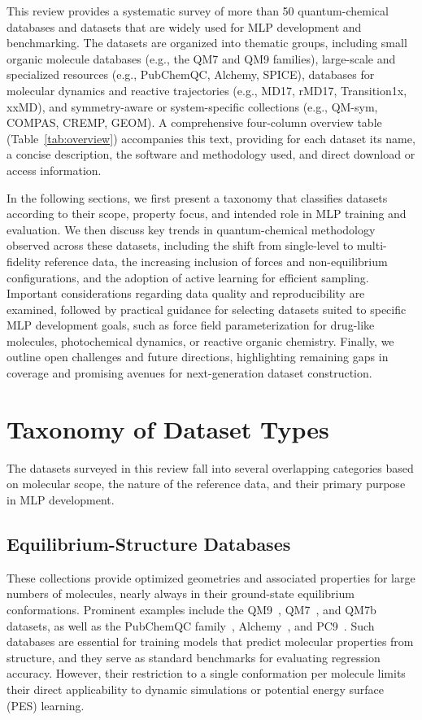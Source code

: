 \documentclass[12pt]{article}
\begin{document}
This review provides a systematic survey of more than 50 quantum-chemical databases and datasets that are widely used for MLP development and benchmarking. The datasets are organized into thematic groups, including small organic molecule databases (e.g., the QM7 and QM9 families), large-scale and specialized resources (e.g., PubChemQC, Alchemy, SPICE), databases for molecular dynamics and reactive trajectories (e.g., MD17, rMD17, Transition1x, xxMD), and symmetry-aware or system-specific collections (e.g., QM-sym, COMPAS, CREMP, GEOM). A comprehensive four-column overview table (Table~\ref{tab:overview}) accompanies this text, providing for each dataset its name, a concise description, the software and methodology used, and direct download or access information.

In the following sections, we first present a taxonomy that classifies datasets according to their scope, property focus, and intended role in MLP training and evaluation. We then discuss key trends in quantum-chemical methodology observed across these datasets, including the shift from single-level to multi-fidelity reference data, the increasing inclusion of forces and non-equilibrium configurations, and the adoption of active learning for efficient sampling. Important considerations regarding data quality and reproducibility are examined, followed by practical guidance for selecting datasets suited to specific MLP development goals, such as force field parameterization for drug-like molecules, photochemical dynamics, or reactive organic chemistry. Finally, we outline open challenges and future directions, highlighting remaining gaps in coverage and promising avenues for next-generation dataset construction.

\section{Taxonomy of Dataset Types}

The datasets surveyed in this review fall into several overlapping categories based on molecular scope, the nature of the reference data, and their primary purpose in MLP development.

\subsection*{Equilibrium-Structure Databases}
These collections provide optimized geometries and associated properties for large numbers of molecules, nearly always in their ground-state equilibrium conformations. Prominent examples include the QM9~\cite{ds1-1}, QM7~\cite{ds7-32}, and QM7b~\cite{ds8-34} datasets, as well as the PubChemQC family~\cite{ds13-28,ds14-29,ds15-27}, Alchemy~\cite{ds10-6}, and PC9~\cite{ds16-26}. Such databases are essential for training models that predict molecular properties from structure, and they serve as standard benchmarks for evaluating regression accuracy. However, their restriction to a single conformation per molecule limits their direct applicability to dynamic simulations or potential energy surface (PES) learning.
\end{document}

